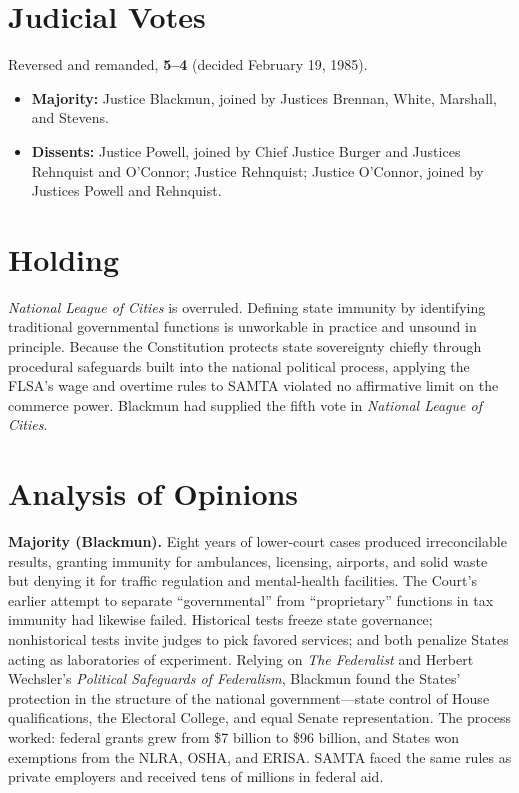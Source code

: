 \documentclass[12pt]{article}
\begin{document}
\section{Judicial Votes}

Reversed and remanded, \textbf{5--4} (decided February 19, 1985).
\begin{itemize}
\item \textbf{Majority:} Justice Blackmun, joined by Justices Brennan, White, Marshall, and Stevens.
\item \textbf{Dissents:} Justice Powell, joined by Chief Justice Burger and Justices Rehnquist and O'Connor; Justice Rehnquist; Justice O'Connor, joined by Justices Powell and Rehnquist.
\end{itemize}

\section{Holding}

\textit{National League of Cities} is overruled. Defining state immunity by identifying traditional governmental functions is unworkable in practice and unsound in principle. Because the Constitution protects state sovereignty chiefly through procedural safeguards built into the national political process, applying the FLSA's wage and overtime rules to SAMTA violated no affirmative limit on the commerce power. Blackmun had supplied the fifth vote in \textit{National League of Cities}.

\section{Analysis of Opinions}

\textbf{Majority (Blackmun).} Eight years of lower-court cases produced irreconcilable results, granting immunity for ambulances, licensing, airports, and solid waste but denying it for traffic regulation and mental-health facilities. The Court's earlier attempt to separate ``governmental'' from ``proprietary'' functions in tax immunity had likewise failed. Historical tests freeze state governance; nonhistorical tests invite judges to pick favored services; and both penalize States acting as laboratories of experiment. Relying on \textit{The Federalist} and Herbert Wechsler's \textit{Political Safeguards of Federalism}, Blackmun found the States' protection in the structure of the national government---state control of House qualifications, the Electoral College, and equal Senate representation. The process worked: federal grants grew from \$7 billion to \$96 billion, and States won exemptions from the NLRA, OSHA, and ERISA. SAMTA faced the same rules as private employers and received tens of millions in federal aid.
\end{document}
